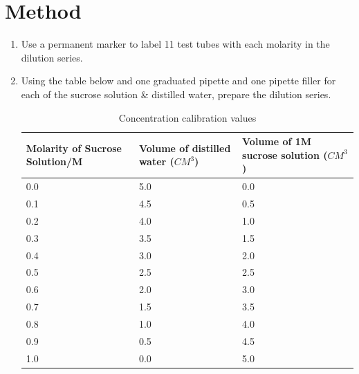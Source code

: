 \documentclass{thomasClass}
\begin{document}
\section{Method}
\begin{enumerate}
    \item Use a permanent marker to label 11 test tubes with each molarity in the dilution series.
    \item Using the table below and one graduated pipette and one pipette filler for each of the sucrose solution \& distilled water, prepare the dilution series.
    \begin{table}[H]
    \centering
    \begin{tabularx}{0.8\textwidth}{XXX}
    Molarity of Sucrose Solution/M & Volume of distilled water ($CM^3$) & Volume of 1M sucrose solution ($CM^3$) \\
    \hline
    0.0 & 5.0 & 0.0 \\
    0.1 & 4.5 & 0.5 \\
    0.2 & 4.0 & 1.0 \\
    0.3 & 3.5 & 1.5 \\
    0.4 & 3.0 & 2.0 \\
    0.5 & 2.5 & 2.5 \\
    0.6 & 2.0 & 3.0 \\
    0.7 & 1.5 & 3.5 \\
    0.8 & 1.0 & 4.0 \\
    0.9 & 0.5 & 4.5 \\
    1.0 & 0.0 & 5.0
    \end{tabularx}
    \caption{Concentration calibration values}
    \label{tab:conCal}
    \end{table}
    

\end{enumerate}
\end{document}
